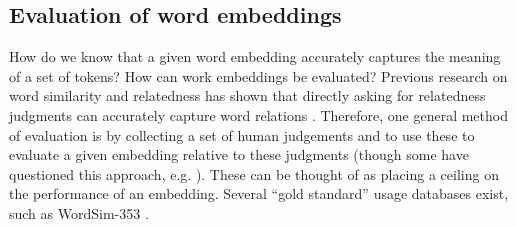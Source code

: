 


\subsection{Evaluation of word embeddings}


How do we know that a given word embedding accurately captures the meaning of a set of tokens? How can work embeddings be evaluated? Previous research on word similarity and relatedness has shown that directly asking for relatedness judgments can accurately capture word relations \cite{finkelstein2001placing}. Therefore, one general method of evaluation is by collecting a set of human judgements and to use these to evaluate a given embedding relative to these judgments (though some have questioned this approach, e.g. \cite{richie2022inter}). These can be thought of as placing a ceiling on the performance of an embedding. Several ``gold standard'' usage databases exist, such as WordSim-353 \cite{finkelstein2001placing, agirre2009study}. 


